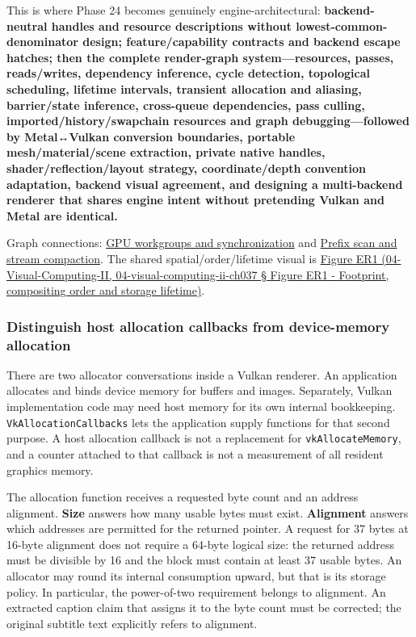 This is where Phase 24 becomes genuinely engine-architectural: \textbf{backend-neutral handles and resource descriptions without lowest-common-denominator design; feature/capability contracts and backend escape hatches; then the complete render-graph system---resources, passes, reads/writes, dependency inference, cycle detection, topological scheduling, lifetime intervals, transient allocation and aliasing, barrier/state inference, cross-queue dependencies, pass culling, imported/history/swapchain resources and graph debugging---followed by Metal↔Vulkan conversion boundaries, portable mesh/material/scene extraction, private native handles, shader/reflection/layout strategy, coordinate/depth convention adaptation, backend visual agreement, and designing a multi-backend renderer that shares engine intent without pretending Vulkan and Metal are identical.}

Graph connections: \hyperref[appendix-f662b5b1773b]{GPU workgroups and synchronization} and \hyperref[appendix-f2ee4d086415]{Prefix scan and stream compaction}. The shared spatial/order/lifetime visual is \href{}{Figure ER1 (04-Visual-Computing-II, 04-visual-computing-ii-ch037 § Figure ER1 - Footprint, compositing order and storage lifetime)}.

\subsubsection{Distinguish host allocation callbacks from device-memory allocation}\label{distinguish-host-allocation-callbacks-from-device-memory-allocation}

There are two allocator conversations inside a Vulkan renderer. An application allocates and binds device memory for buffers and images. Separately, Vulkan implementation code may need host memory for its own internal bookkeeping. \texttt{VkAllocationCallbacks} lets the application supply functions for that second purpose. A host allocation callback is not a replacement for \texttt{vkAllocateMemory}, and a counter attached to that callback is not a measurement of all resident graphics memory.

The allocation function receives a requested byte count and an address alignment. \textbf{Size} answers how many usable bytes must exist. \textbf{Alignment} answers which addresses are permitted for the returned pointer. A request for 37 bytes at 16-byte alignment does not require a 64-byte logical size: the returned address must be divisible by 16 and the block must contain at least 37 usable bytes. An allocator may round its internal consumption upward, but that is its storage policy. In particular, the power-of-two requirement belongs to alignment. An extracted caption claim that assigns it to the byte count must be corrected; the original subtitle text explicitly refers to alignment.

